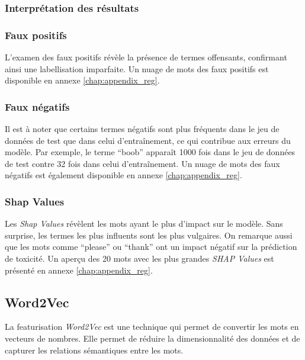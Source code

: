\subsubsection{Interprétation des résultats}
\subsubsection{Faux positifs}
L'examen des faux positifs révèle la présence de termes offensants, confirmant ainsi une labellisation imparfaite. 
Un nuage de mots des faux positifs est disponible en annexe \ref{chap:appendix_reg}.

\subsubsection{Faux négatifs}
Il est à noter que certains termes négatifs sont plus fréquents dans le jeu de données de test que dans celui d'entraînement, ce qui contribue aux erreurs du modèle.
Par exemple, le terme ``boob'' apparaît 1000 fois dans le jeu de données de test contre 32 fois dans celui d'entraînement. 
Un nuage de mots des faux négatifs est également disponible en annexe \ref{chap:appendix_reg}.

\subsubsection{Shap Values}
Les \textit{Shap Values} révèlent les mots ayant le plus d'impact sur le modèle. 
Sans surprise, les termes les plus influents sont les plus vulgaires. On remarque aussi que les mots comme ``please'' ou ``thank'' ont un impact négatif sur la prédiction de toxicité.
Un aperçu des 20 mots avec les plus grandes \textit{SHAP Values} est présenté en annexe \ref{chap:appendix_reg}.

\subsection{Word2Vec}
La featurisation \textit{Word2Vec} est une technique qui permet de convertir les mots en vecteurs de nombres. 
Elle permet de réduire la dimensionnalité des données et de capturer les relations sémantiques entre les mots.

